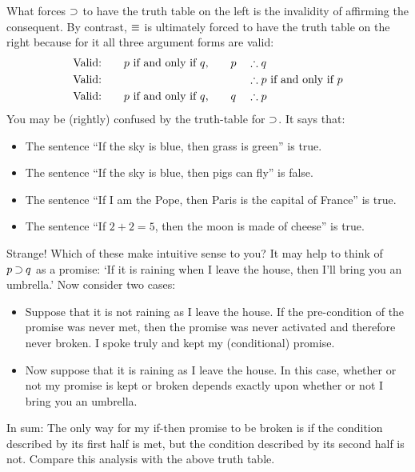 \documentclass[options]{philosophersimprint}
\theoremstyle{definition}
\begin{document}
What forces $\mathbin{\supset}$ to have the truth table on the left is the invalidity of affirming the consequent. By contrast, $\mathbin{\equiv}$ is ultimately forced to have the truth table on the right because for it all three argument forms are valid:
\begin{align}
\nonumber
\text{Valid:}&\text{\qquad $p$ if and only if $q$,\qquad $p$} && \therefore q\\
\nonumber
\text{Valid:}& &&\therefore \text{$p$ if and only if $p$}\\
\nonumber
\text{Valid:}&\text{\qquad $p$ if and only if $q$,\qquad $q$}& &\therefore p
\end{align}
You may be (rightly) confused by the truth-table for $\mathbin{\supset}$. It says that:
\begin{itemize}
    \item The sentence ``If the sky is blue, then grass is green'' is true.
    \item The sentence ``If the sky is blue, then pigs can fly'' is false.
    \item The sentence ``If I am the Pope, then Paris is the capital of France'' is true.
    \item The sentence ``If $2+2=5$, then the moon is made of cheese'' is true.
\end{itemize}
Strange! Which of these make intuitive sense to you? It may help to think of $p \mathbin{\supset} q$ as a promise: `If it is raining when I leave the house, then I'll bring you an umbrella.’ Now consider two cases:
\begin{itemize}
    \item Suppose that it is not raining as I leave the house. If the pre-condition of the promise was never met, then the promise was never activated and therefore never broken. I spoke truly and kept my (conditional) promise.
    \item Now suppose that it is raining as I leave the house. In this case, whether or not my promise is kept or broken depends exactly upon whether or not I bring you an umbrella.
\end{itemize}
In sum: The only way for my if-then promise to be broken is if the condition described by its first half is met, but the condition described by its second half is not. Compare this analysis with the above truth table.
\end{document}
